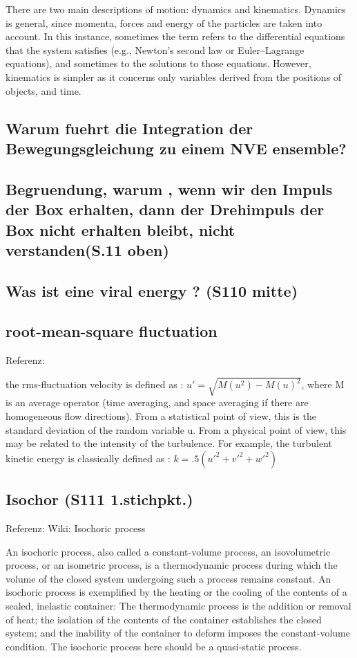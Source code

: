 \documentclass[]{article}
\begin{document}
There are two main descriptions of motion: dynamics and kinematics. Dynamics is general, since momenta, forces and energy of the particles are taken into account. In this instance, sometimes the term refers to the differential equations that the system satisfies (e.g., Newton's second law or Euler–Lagrange equations), and sometimes to the solutions to those equations.
However, kinematics is simpler as it concerns only variables derived from the positions of objects, and time. 

\subsection{Warum fuehrt die Integration der Bewegungsgleichung zu einem NVE ensemble?}

\subsection{Begruendung, warum , wenn wir den Impuls der Box erhalten, dann der Drehimpuls der Box nicht erhalten bleibt, nicht verstanden(S.11 oben)}

\subsection{Was ist eine \glqq viral energy \grqq? (S110 mitte)}

\subsection{root-mean-square fluctuation}
Referenz: %

the \glqq rms-fluctuation velocity \grqq is defined as : $u'=\sqrt{ M(u^2) - {M(u)}^2 }$, where M is an average operator (time averaging, and space averaging if there are homogeneous flow directions). From a statistical point of view, this is the standard deviation of the random variable u. From a physical point of view, this may be related to the intensity of the turbulence. For example, the turbulent kinetic energy is classically defined as : $k=.5(u'^2+v'^2+w'^2)$

\subsection{Isochor (S111 1.stichpkt.)}
Referenz: Wiki: Isochoric process

An isochoric process, also called a constant-volume process, an isovolumetric process, or an isometric process, is a thermodynamic process during which the volume of the closed system undergoing such a process remains constant. An isochoric process is exemplified by the heating or the cooling of the contents of a sealed, inelastic container: The thermodynamic process is the addition or removal of heat; the isolation of the contents of the container establishes the closed system; and the inability of the container to deform imposes the constant-volume condition. The isochoric process here should be a quasi-static process.
\end{document}
